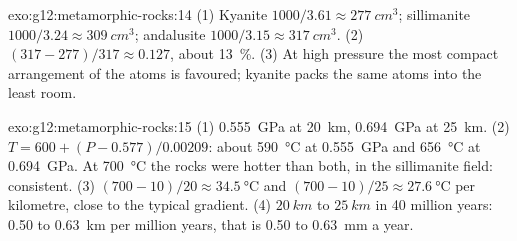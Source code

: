 \begin{solution}{exo:g12:metamorphic-rocks:14}
(1) Kyanite $1000/3.61 \approx \qty{277}{cm^3}$; sillimanite $1000/3.24
\approx \qty{309}{cm^3}$; andalusite $1000/3.15 \approx \qty{317}{cm^3}$.
(2) $(317 - 277)/317 \approx 0.127$, about \qty{13}{\percent}. (3) At high
pressure the most compact arrangement of the atoms is favoured; kyanite
packs the same atoms into the least room.
\end{solution}

\begin{solution}{exo:g12:metamorphic-rocks:15}
(1) \qty{0.555}{GPa} at \qty{20}{km}, \qty{0.694}{GPa} at \qty{25}{km}.
(2) $T = 600 + (P - 0.577)/0.00209$: about \qty{590}{\celsius} at
\qty{0.555}{GPa} and \qty{656}{\celsius} at \qty{0.694}{GPa}. At
\qty{700}{\celsius} the rocks were hotter than both, in the sillimanite
field: consistent. (3) $(700 - 10)/20 \approx \qty{34.5}{\celsius}$ and
$(700 - 10)/25 \approx \qty{27.6}{\celsius}$ per kilometre, close to the
typical gradient. (4) $\qty{20}{km}$ to $\qty{25}{km}$ in 40 million years:
0.50 to \qty{0.63}{km} per million years, that is 0.50 to \qty{0.63}{mm} a
year.
\end{solution}

